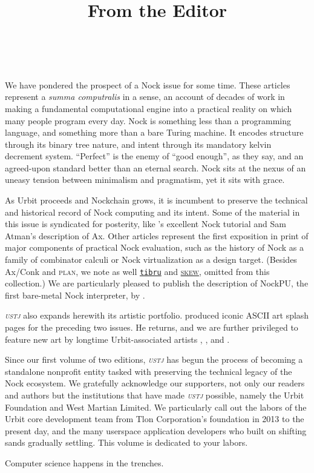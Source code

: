 \documentclass[twoside]{article}
\title{From the Editor}
\author{\authorname~\authorpatp \\ \affiliation}
\date{}
\begin{document}
\thispagestyle{firststyle}

\setcounter{page}{1}

We have pondered the prospect of a Nock issue for some time.  These articles represent a \textit{summa computralis} in a sense, an account of decades of work in making a fundamental computational engine into a practical reality on which many people program every day.  Nock is something less than a programming language, and something more than a bare Turing machine.  It encodes structure through its binary tree nature, and intent through its mandatory kelvin decrement system.  ``Perfect'' is the enemy of ``good enough'', as they say, and an agreed-upon standard better than an eternal search.  Nock sits at the nexus of an uneasy tension between minimalism and pragmatism, yet it sits with grace.

As Urbit proceeds and Nockchain grows, it is incumbent to preserve the technical and historical record of Nock computing and its intent.  Some of the material in this issue is syndicated for posterity, like 's excellent Nock tutorial and Sam Atman's description of Ax.  Other articles represent the first exposition in print of major components of practical Nock evaluation, such as the history of Nock as a family of combinator calculi or Nock virtualization as a design target.  (Besides Ax/Conk and \textsc{plan}, we note as well \href{https://github.com/tibru/tibru}{\texttt{tibru}} and \href{https://github.com/urbit/urbit/blob/skew/pkg/hs/urbit-skew/skew.md}{\textsc{skew}}, omitted from this collection.)  We are particularly pleased to publish the description of NockPU, the first bare-metal Nock interpreter, by .

\emph{\textsc{ustj}} also expands herewith its artistic portfolio.   produced iconic ASCII art splash pages for the preceding two issues.  He returns, and we are further privileged to feature new art by longtime Urbit-associated artists , , and .

Since our first volume of two editions, \emph{\textsc{ustj}} has begun the process of becoming a standalone nonprofit entity tasked with preserving the technical legacy of the Nock ecosystem.  We gratefully acknowledge our supporters, not only our readers and authors but the institutions that have made \emph{\textsc{ustj}} possible, namely the Urbit Foundation and West Martian Limited.  We particularly call out the labors of the Urbit core development team from Tlon Corporation's foundation in 2013 to the present day, and the many userspace application developers who built on shifting sands gradually settling.  This volume is dedicated to your labors.

Computer science happens in the trenches.  \tombstone{}
\end{document}
